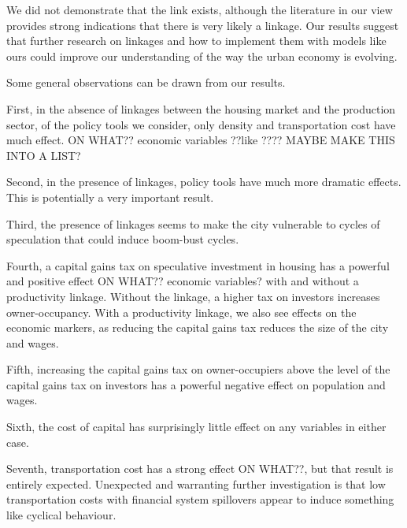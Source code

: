 We did not demonstrate that the link exists, although the literature in our view provides strong indications that there is very likely a linkage.  Our results suggest that further research on linkages and how to implement them with models like ours could improve our understanding of the way the urban economy is evolving.   


Some general observations can be drawn from our results. 

First, in the absence of linkages between the housing market and the production sector, of the policy tools we consider, only density and transportation cost have much effect. {\color{red} ON WHAT??  economic variables ??like ???? MAYBE MAKE THIS INTO A LIST? }


Second, in the presence of linkages, policy tools have much more dramatic effects. This is potentially a very important result. 

Third, the presence of linkages seems to make the city vulnerable to cycles of speculation that could induce boom-bust cycles. 



Fourth, a capital gains tax on speculative investment in housing has a powerful and positive effect {\color{red} ON WHAT??  economic variables? } with and without a productivity linkage. Without the linkage, a higher tax on investors increases owner-occupancy. With a productivity linkage, we also see effects on the economic markers, as reducing the capital gains tax reduces the size of the city and wages. 

Fifth, increasing the capital gains tax on owner-occupiers above the level of the capital gains tax on investors has a powerful negative effect on population and wages.

Sixth, the cost of capital has surprisingly little effect on any variables in either case.

Seventh, transportation cost has a strong effect {\color{red} ON WHAT??}, but that result is entirely expected. Unexpected and warranting further investigation is that low transportation costs with financial system spillovers appear to induce something like cyclical behaviour.


